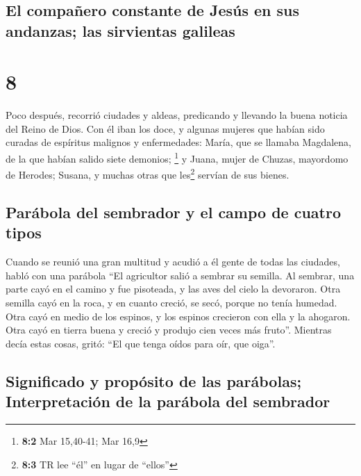 \begin{paracol}{2}
{\subsection{El compañero constante de Jesús en sus andanzas; las
sirvientas
galileas}\label{el-compauxf1ero-constante-de-jesuxfas-en-sus-andanzas-las-sirvientas-galileas}}

\hypertarget{section-14}{%
\section{8}\label{section-14}}

 Poco después, recorrió ciudades y aldeas, predicando y
llevando la buena noticia del Reino de Dios. Con él iban los doce,
 y algunas mujeres que habían sido curadas de espíritus
malignos y enfermedades: María, que se llamaba Magdalena, de la que
habían salido siete demonios; \footnote{\textbf{8:2} Mar 15,40-41; Mar
  16,9}  y Juana, mujer de Chuzas, mayordomo de Herodes;
Susana, y muchas otras que les\footnote{\textbf{8:3} TR lee ``él'' en
  lugar de ``ellos''} servían de sus bienes.

\hypertarget{paruxe1bola-del-sembrador-y-el-campo-de-cuatro-tipos}{%
\subsection{Parábola del sembrador y el campo de cuatro
tipos}\label{paruxe1bola-del-sembrador-y-el-campo-de-cuatro-tipos}}

 Cuando se reunió una gran multitud y acudió a él gente de
todas las ciudades, habló con una parábola  ``El
agricultor salió a sembrar su semilla. Al sembrar, una parte cayó en el
camino y fue pisoteada, y las aves del cielo la devoraron.
 Otra semilla cayó en la roca, y en cuanto creció, se
secó, porque no tenía humedad.  Otra cayó en medio de los
espinos, y los espinos crecieron con ella y la ahogaron. 
Otra cayó en tierra buena y creció y produjo cien veces más fruto''.
Mientras decía estas cosas, gritó: ``El que tenga oídos para oír, que
oiga''.

\hypertarget{significado-y-propuxf3sito-de-las-paruxe1bolas-interpretaciuxf3n-de-la-paruxe1bola-del-sembrador}{%
\subsection{Significado y propósito de las parábolas; Interpretación de
la parábola del
sembrador}\label{significado-y-propuxf3sito-de-las-paruxe1bolas-interpretaciuxf3n-de-la-paruxe1bola-del-sembrador}}


\end{paracol}

